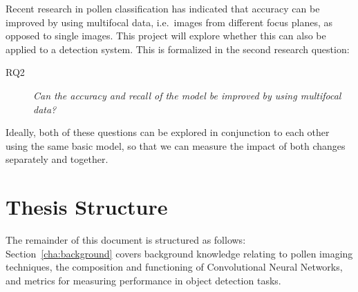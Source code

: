 Recent research in pollen classification has indicated that accuracy can be improved by using multifocal data, i.e.\ images from different focus planes, as opposed to single images.
This project will explore whether this can also be applied to a detection system.
This is formalized in the second research question:

\begin{description}
    \item[RQ2] \textit{Can the accuracy and recall of the model be improved by using multifocal data?}
\end{description}

Ideally, both of these questions can be explored in conjunction to each other using the same basic model, so that we can measure the impact of both changes separately and together.

\section{Thesis Structure}\label{sec:thesisStructure}
The remainder of this document is structured as follows:
Section~\ref{cha:background} covers background knowledge relating to pollen imaging techniques, the composition and functioning of Convolutional Neural Networks, and metrics for measuring performance in object detection tasks.